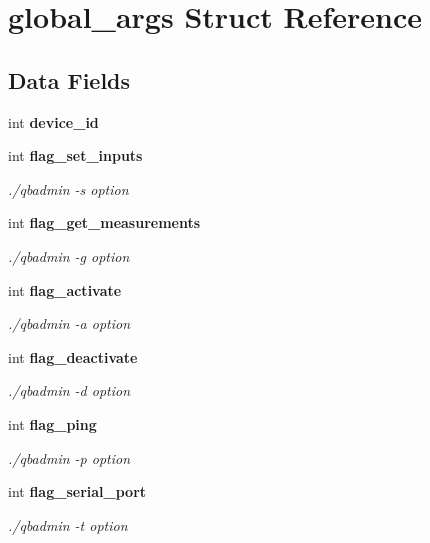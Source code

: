 \section{global\+\_\+args Struct Reference}
\label{structglobal__args}
\subsection*{Data Fields}
\begin{DoxyCompactItemize}
\item 
\mbox{\label{structglobal__args_accfd0301c469314772cc651ec198d492}} 
int {\bfseries device\+\_\+id}
\item 
\mbox{\label{structglobal__args_a8c2bd6bbe7e544186ac9dafe368eda0a}} 
int \textbf{ flag\+\_\+set\+\_\+inputs}
\begin{DoxyCompactList}\small\item\em ./qbadmin -\/s option \end{DoxyCompactList}\item 
\mbox{\label{structglobal__args_ae6be84e61dfa72e2992e18b2ff872d37}} 
int \textbf{ flag\+\_\+get\+\_\+measurements}
\begin{DoxyCompactList}\small\item\em ./qbadmin -\/g option \end{DoxyCompactList}\item 
\mbox{\label{structglobal__args_a357acdae444e13e67d3747246a2a6537}} 
int \textbf{ flag\+\_\+activate}
\begin{DoxyCompactList}\small\item\em ./qbadmin -\/a option \end{DoxyCompactList}\item 
\mbox{\label{structglobal__args_a3f8a32491b8271e7dcf9645888fd5d90}} 
int \textbf{ flag\+\_\+deactivate}
\begin{DoxyCompactList}\small\item\em ./qbadmin -\/d option \end{DoxyCompactList}\item 
\mbox{\label{structglobal__args_a666e67d4cbdc4b0c0ceaebc7f0d7e4ae}} 
int \textbf{ flag\+\_\+ping}
\begin{DoxyCompactList}\small\item\em ./qbadmin -\/p option \end{DoxyCompactList}\item 
\mbox{\label{structglobal__args_a5d91f73cfac19063f3b690444214cb11}} 
int \textbf{ flag\+\_\+serial\+\_\+port}
\begin{DoxyCompactList}\small\item\em ./qbadmin -\/t option \end{DoxyCompactList}\item 

\end{DoxyCompactItemize}

